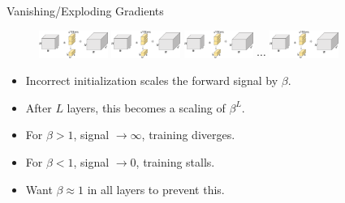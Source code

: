 \documentclass[t,xcolor=dvipsnames]{beamer}
\begin{document}
\begin{frame}{Vanishing/Exploding Gradients}{}
\vspace{-2em}
\begin{figure}
    \includegraphics[width=0.2\textwidth, page=1, bb = 0 0 440 600, clip=true]{../Figs/PDF/sparsification}
    \includegraphics[width=0.2\textwidth, page=1, bb = 0 0 440 600, clip=true]{../Figs/PDF/sparsification}
    \includegraphics[width=0.2\textwidth, page=1, bb = 0 0 440 600, clip=true]{../Figs/PDF/sparsification}
    $\cdots$
    \includegraphics[width=0.2\textwidth, page=1, bb = 0 0 400 600, clip=true]{../Figs/PDF/sparsification}
\end{figure}

\begin{itemize}
    \item Incorrect initialization scales the forward signal by $\beta$.
    \item After $L$ layers, this becomes a scaling of $\beta^L$.
    \item For \alert{$\beta > 1$}, signal $\rightarrow\infty$, training \alert{diverges}.
    \item For \alert{$\beta < 1$}, signal $\rightarrow 0$, training \alert{stalls}.
    \item Want $\beta\approx 1$ in all layers to prevent this.
\end{itemize}
\end{frame}
\end{document}
